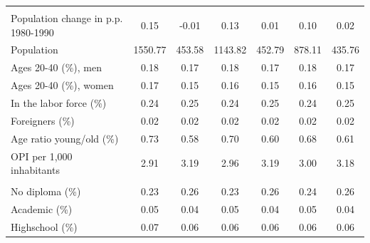 \begin{table}[!h]
{\begin{threeparttable}
\begin{tabular}[t]{lcccccc}
\addlinespace[0.3em]
\multicolumn{7}{l}{\textit{Demographics}}\\
\hspace{1em}\hspace{1em}Population change in p.p. 1980-1990 & 0.15 & -0.01 & 0.13 & 0.01 & 0.10 & 0.02\\
\hspace{1em}\hspace{1em}Population & 1550.77 & 453.58 & 1143.82 & 452.79 & 878.11 & 435.76\\
\hspace{1em}\hspace{1em}Ages 20-40 (\%), men & 0.18 & 0.17 & 0.18 & 0.17 & 0.18 & 0.17\\
\hspace{1em}\hspace{1em}Ages 20-40 (\%), women & 0.17 & 0.15 & 0.16 & 0.15 & 0.16 & 0.15\\
\hspace{1em}\hspace{1em}In the labor force (\%) & 0.24 & 0.25 & 0.24 & 0.25 & 0.24 & 0.25\\
\hspace{1em}\hspace{1em}Foreigners (\%) & 0.02 & 0.02 & 0.02 & 0.02 & 0.02 & 0.02\\
\hspace{1em}\hspace{1em}Age ratio young/old (\%) & 0.73 & 0.58 & 0.70 & 0.60 & 0.68 & 0.61\\
\hspace{1em}\hspace{1em}OPI per 1,000 inhabitants & 2.91 & 3.19 & 2.96 & 3.19 & 3.00 & 3.18\\
\addlinespace[0.3em]
\multicolumn{7}{l}{\textit{Education}}\\
\hspace{1em}\hspace{1em}\hspace{1em}No diploma (\%) & 0.23 & 0.26 & 0.23 & 0.26 & 0.24 & 0.26\\
\hspace{1em}\hspace{1em}\hspace{1em}Academic (\%) & 0.05 & 0.04 & 0.05 & 0.04 & 0.05 & 0.04\\
\hspace{1em}\hspace{1em}\hspace{1em}Highschool (\%) & 0.07 & 0.06 & 0.06 & 0.06 & 0.06 & 0.06\\

\end{tabular}
\end{threeparttable}}
\end{table}
